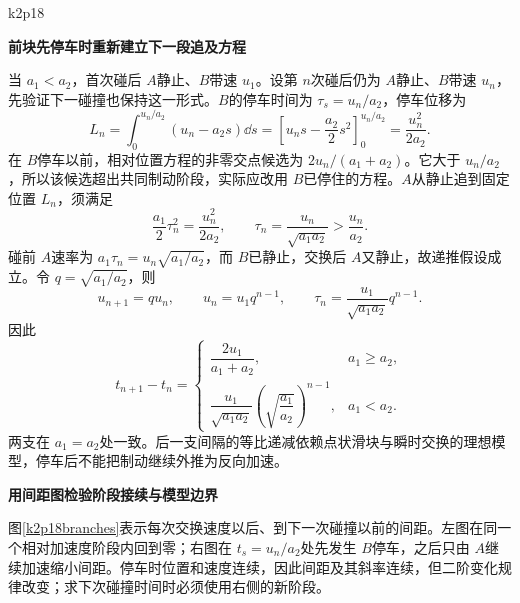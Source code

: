 \begin{drillsolution}{k2p18}
\par\medskip{}\noindent\textbf{前块先停车时重新建立下一段追及方程}\par\nobreak
当 $a_1<a_2$，首次碰后 $A$静止、$B$带速 $u_1$。设第 $n$次碰后仍为 $A$静止、$B$带速 $u_n$，先验证下一碰撞也保持这一形式。$B$的停车时间为 $\tau_s=u_n/a_2$，停车位移为
\[
 L_n=\int_0^{u_n/a_2}(u_n-a_2s)\dd s
 =\left[u_ns-\frac{a_2}{2}s^2\right]_0^{u_n/a_2}
 =\frac{u_n^2}{2a_2}.
\]
在 $B$停车以前，相对位置方程的非零交点候选为 $2u_n/(a_1+a_2)$。它大于 $u_n/a_2$，所以该候选超出共同制动阶段，实际应改用 $B$已停住的方程。$A$从静止追到固定位置 $L_n$，须满足
\[
 \frac{a_1}{2}\tau_n^2=\frac{u_n^2}{2a_2},
 \qquad \tau_n=\frac{u_n}{\sqrt{a_1a_2}}>\frac{u_n}{a_2}.
\]
碰前 $A$速率为 $a_1\tau_n=u_n\sqrt{a_1/a_2}$，而 $B$已静止，交换后 $A$又静止，故递推假设成立。令 $q=\sqrt{a_1/a_2}$，则
\[u_{n+1}=q u_n,\qquad u_n=u_1q^{n-1},\qquad
 \tau_n=\frac{u_1}{\sqrt{a_1a_2}}q^{n-1}.
\]
因此
\[\boxed{t_{n+1}-t_n=\begin{cases}
\dfrac{2u_1}{a_1+a_2},&a_1\ge a_2,\\[5pt]
\dfrac{u_1}{\sqrt{a_1a_2}}\left(\sqrt{\dfrac{a_1}{a_2}}\right)^{n-1},&a_1<a_2.
\end{cases}}
\]
两支在 $a_1=a_2$处一致。后一支间隔的等比递减依赖点状滑块与瞬时交换的理想模型，停车后不能把制动继续外推为反向加速。



\par\medskip{}\noindent\textbf{用间距图检验阶段接续与模型边界}\par\nobreak
图\ref{k2p18branches}表示每次交换速度以后、到下一次碰撞以前的间距。左图在同一个相对加速度阶段内回到零；右图在 $t_s=u_n/a_2$处先发生 $B$停车，之后只由 $A$继续加速缩小间距。停车时位置和速度连续，因此间距及其斜率连续，但二阶变化规律改变；求下次碰撞时间时必须使用右侧的新阶段。
\end{drillsolution}
